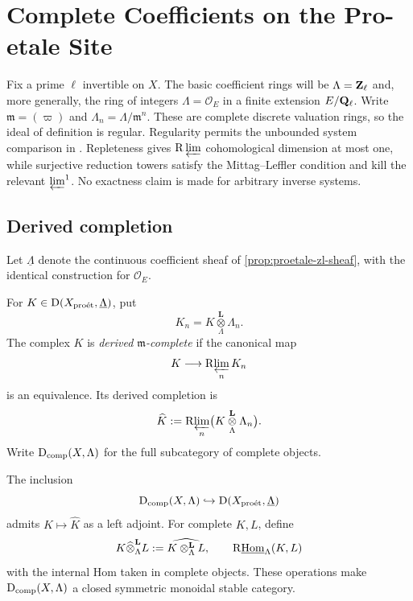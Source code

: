 \chapter{Complete Coefficients on the Pro-etale Site}
\label{chap:proetale-coefficients}

Fix a prime \(\ell\) invertible on \(X\).  The basic coefficient rings will
be \(\Lambda=\mathbf Z_\ell\) and, more generally, the ring of integers
\(\Lambda=\mathcal O_E\) in a finite extension \(E/\mathbf Q_\ell\).  Write
\(\mathfrak m=(\varpi)\) and \(\Lambda_n=\Lambda/\mathfrak m^n\).  These are
complete discrete valuation rings, so the ideal of definition is regular.
Regularity permits the unbounded system comparison in
\cite[Lemma~3.5.7(5)]{BhattScholzeProEtale}.  Repleteness gives
\(\mathrm R\varprojlim\) cohomological dimension at most one, while surjective
reduction towers satisfy the Mittag--Leffler condition and kill the relevant
\(\varprojlim^1\).  No exactness claim is made for arbitrary inverse systems.

\section{Derived completion}

Let \(\underline\Lambda\) denote the continuous coefficient sheaf of
\cref{prop:proetale-zl-sheaf}, with the identical construction for
\(\mathcal O_E\).

\begin{definition}
\label{def:derived-complete-proetale}
For \(K\in\mathrm D(X_{\mathrm{pro\acute et}},\underline\Lambda)\), put
\[
  K_n=K\mathbin{\mathop\otimes\limits^{\mathbf L}_{\Lambda}}\Lambda_n.
\]
The complex \(K\) is \emph{derived \(\mathfrak m\)-complete} if the canonical
map
\begin{equation}
\label{eq:derived-completion-map}
 K\longrightarrow
 \mathrm R\!\varprojlim_n K_n
\end{equation}
is an equivalence.  Its derived completion is
\[
  \widehat K:=\mathrm R\!\varprojlim_n
  \bigl(K\mathbin{\mathop\otimes\limits^{\mathbf L}_{\Lambda}}\Lambda_n\bigr).
\]
Write \(\mathrm D_{\mathrm{comp}}(X,\Lambda)\) for the full subcategory of complete objects.
\end{definition}

\begin{proposition}
\label{prop:completion-reflector}
The inclusion
\[
  \mathrm D_{\mathrm{comp}}(X,\Lambda)\hookrightarrow
  \mathrm D(X_{\mathrm{pro\acute et}},\underline\Lambda)
\]
admits \(K\mapsto\widehat K\) as a left adjoint.  For complete \(K,L\), define
\[
 K\widehat\otimes^{\mathbf L}_{\Lambda}L
   :=\widehat{K\otimes^{\mathbf L}_{\Lambda}L},
 \qquad
 \mathrm R\underline{\operatorname{Hom}}_{\Lambda}(K,L)
\]
with the internal Hom taken in complete objects.  These operations make
\(\mathrm D_{\mathrm{comp}}(X,\Lambda)\) a closed symmetric monoidal stable category.
\end{proposition}

